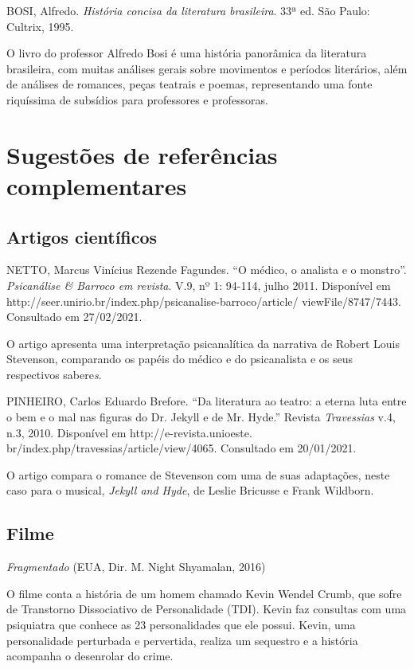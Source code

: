 \documentclass[12pt]{extarticle}
\begin{document}
{BOSI, Alfredo. \emph{História concisa da literatura brasileira}. 33ª ed.
São Paulo: Cultrix, 1995.

O livro do professor Alfredo Bosi é uma história panorâmica da
literatura brasileira, com muitas análises gerais sobre movimentos e
períodos literários, além de análises de romances, peças teatrais e
poemas, representando uma fonte riquíssima de subsídios para professores
e professoras.

\section{Sugestões de referências complementares}

\subsection{Artigos científicos}

NETTO, Marcus Vinícius Rezende Fagundes. ``O médico, o analista e o
monstro''. \emph{Psicanálise \& Barroco em revista}. V.9, nº 1: 94-114,
julho 2011. Disponível em
http://seer.unirio.br/index.php/psicanalise-barroco/article/
viewFile/8747/7443. Consultado em 27/02/2021.

O artigo apresenta uma interpretação psicanalítica da narrativa de
Robert Louis Stevenson, comparando os papéis do médico e do psicanalista
e os seus respectivos sabere\emph{s}.

PINHEIRO, Carlos Eduardo Brefore. ``Da literatura ao teatro: a eterna
luta entre o bem e o mal nas figuras do Dr. Jekyll e de Mr. Hyde.''
Revista \emph{Travessias} v.4, n.3, 2010. Disponível em
http://e-revista.unioeste. br/index.php/travessias/article/view/4065.
Consultado em 20/01/2021.

O artigo compara o romance de Stevenson com uma de suas adaptações,
neste caso para o musical, \emph{Jekyll and Hyde}, de Leslie Bricusse e
Frank Wildborn.

\subsection{Filme}

\emph{Fragmentado} (EUA, Dir. M. Night Shyamalan, 2016)

O filme conta a história de um homem chamado Kevin Wendel Crumb, que
sofre de Transtorno Dissociativo de Personalidade (TDI). Kevin faz
consultas com uma psiquiatra que conhece as 23 personalidades que ele
possui. Kevin, uma personalidade perturbada e pervertida, realiza um
sequestro e a história acompanha o desenrolar do crime.

}
\end{document}
